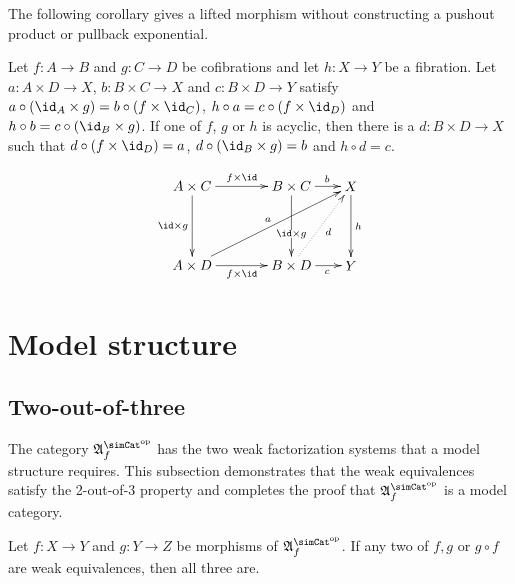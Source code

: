 \documentclass{tac}
\newcommand\hide[1]{}
\newcommand\dual{^{\mathrm{op}}}
\newcommand\s{^{\simCat\dual}}
\newcommand\of{:}
\newcommand\f{_f}
\newcommand\ambient{\mathfrak A}
\begin{document}
The following corollary gives a lifted morphism without constructing a pushout product or pullback exponential.

\begin{corollary} Let $f\of A\to B$ and $g\of C\to D$ be cofibrations and let $h\of X\to Y$ be a fibration. Let $a\of A\times D\to X$, $b\of B\times C\to X$ and $c\of B \times D\to Y$ satisfy $a\circ(\id_A\times g) = b\circ(f\times \id_C)$, $h\circ a=c\circ(f\times \id_D)$ and $h\circ b=c\circ(\id_B\times g)$. If one of $f$, $g$ or $h$ is acyclic, then there is a $d\of B\times D\to X$ such that $d\circ(f\times\id_D)=a$, $d\circ(\id_B\times g)=b$ and $h\circ d = c$.
\hide{\[\xymatrix{
A\times C\ar[r]^{f\times \id}\ar[d]_{\id\times g} & B\times C\ar[r]^b\ar[d]_(.3){\id\times g} & X\ar[d]^h\\
A\times D\ar[r]_{f\times \id} \ar[urr]^(.3){a} & B\times D \ar[r]_c \ar@{.>}[ur]_{d} & Y
}\]}
\[\xy
(0,20)*+{A\times C}="AC",(25,20)*+{B\times C}="BC",(40,20)*+{X}="X",
(0,0)*+{A\times D}="AD",(25,0)*+{B\times D}="BD",(40,0)*+{Y}="Y"
\ar^{f\times\id} "AC";"BC"
\ar_{\id\times g} "AC";"AD"
\ar_{f\times\id} "AD";"BD"
\ar^{a} "AD";"X"
\ar|(.6){\id\times g} "BC";"BD"
\ar^(.6){b} "BC";"X"
\ar@{.>}_{d} "BD";"X"
\ar_(.6){c} "BD";"Y"
\ar^{h} "X";"Y"
\endxy\]

\hide{Transposed view:
\[\xymatrix{
A\ar[r]^{a^t}\ar[d]_f & X^D\ar[r]^{X^g}\ar[d]^(.7){h^D} & X^C\ar[d]^{h^C}\\
B\ar[r]_{c^t} \ar[urr]_(.7){b^t} \ar@{.>}[ur]^{d^t} & Y^D \ar[r]_{Y^g} & Y^C
}\]}\label{triple lift}
\end{corollary}




\section{Model structure}
\subsection{Two-out-of-three}
The category $\ambient\s\f$ has the two weak factorization systems that a model structure requires. This subsection demonstrates that the weak equivalences satisfy the 2-out-of-3 property and completes the proof that $\ambient\s\f$ is a model category.

\begin{lemma}[2-out-of-3] Let $f\of X\to Y$ and $g\of Y\to Z$ be morphisms of $\ambient\s\f$. If any two of $f,g$ or $g\circ f$ are weak equivalences, then all three are. \label{toot}\end{lemma}
\end{document}
